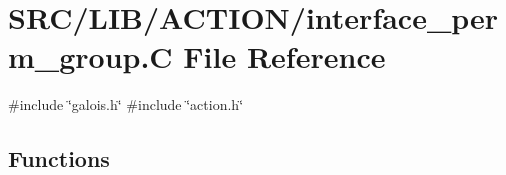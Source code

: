 \hypertarget{interface__perm__group_8_c}{}\section{S\+R\+C/\+L\+I\+B/\+A\+C\+T\+I\+O\+N/interface\+\_\+perm\+\_\+group.C File Reference}
\label{interface__perm__group_8_c}
{\ttfamily \#include \char`\"{}galois.\+h\char`\"{}}\newline
{\ttfamily \#include \char`\"{}action.\+h\char`\"{}}\newline
\subsection*{Functions}
